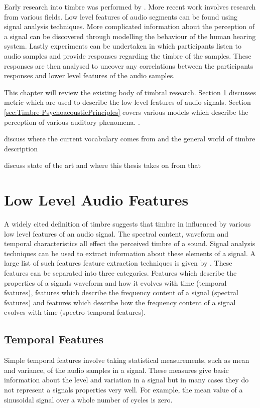 	Early research into timbre was performed by \citet{helmholtz1875on}. More recent work involves research from various
	fields. Low level features of audio segments can be found using signal analysis techniques. More complicated
	information about the perception of a signal can be discovered through modelling the behaviour of the human hearing
	system. Lastly experiments can be undertaken in which participants listen to audio samples and provide responses
	regarding the timbre of the samples. These responses are then analysed to uncover any correlations between the
	participants responses and lower level features of the audio samples.

	This chapter will review the existing body of timbral research. Section \ref{sec:Timbre-LowLevelFeatures} discusses
	metric which are used to describe the low level features of audio signals. Section
	\ref{sec:Timbre-PsychoacousticPrinciples} covers various models which describe the perception of various auditory
	phenomena. .

	\note
	{
		discuss where the current vocabulary comes from and the general world of timbre description

		discuss state of the art and where this thesis takes on from that
	}

\section{Low Level Audio Features}
\label{sec:Timbre-LowLevelFeatures}
	A widely cited definition of timbre \citep{ASA1960american} suggests that timbre in influenced by various low level
	features of an audio signal. The spectral content, waveform and temporal characteristics all effect the perceived
	timbre of a sound. Signal analysis techniques can be used to extract information about these elements of a signal.
	A large list of such features feature extraction techniques is given by \citep{peeters2004a}. These features can be
	separated into three categories. Features which describe the properties of a signals waveform and how it evolves
	with time (temporal features), features which describe the frequency content of a signal (spectral features) and
	features which describe how the frequency content of a signal evolves with time (spectro-temporal features). 

	\subsection{Temporal Features}
	\label{sec:Timbre-LowLevelFeatures-Temporal}
		Simple temporal features involve taking statistical measurements, such as mean and variance, of the audio
		samples in a signal. These measures give basic information about the level and variation in a signal but in
		many cases they do not represent a signals properties very well. For example, the mean value of a sinusoidal
		signal over a whole number of cycles is zero. 


